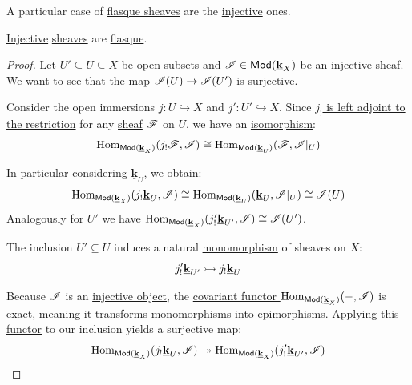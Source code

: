 \documentclass[../../main]{subfiles}
\begin{document}
A particular case of \hyperref[def:flasque-sheaf]{flasque sheaves} are the \hyperref[def:injective-projective-object]{injective} ones.
\begin{lemma}\label{lemma:injective-sheaves-are-flasque}
  \hyperref[def:injective-projective-object]{Injective} \hyperref[def:sheaf]{sheaves} are \hyperref[def:flasque-sheaf]{flasque}.
\end{lemma}
\begin{proof}
  Let \(U' \subseteq U \subseteq X\) be open subsets and \(\mathscr{I} \in \mathsf{Mod}(\underline{\mathbf{k}}_{X})\) be an \hyperref[def:injective-projective-object]{injective} \hyperref[def:sheaf]{sheaf}.
  We want to see that the map \(\mathscr{I}(U) \to \mathscr{I}(U')\) is surjective.

  Consider the open immersions \(j\colon U \hookrightarrow X\) and \(j'\colon U' \hookrightarrow X\).
  Since \hyperref[thm:open-immersion-adjunction-sheaf]{\(j_{!}\) is left adjoint to the restriction} for any \hyperref[def:sheaf]{sheaf} \(\mathscr{F}\) on \(U\), we have an \hyperref[def:categorical-isomorphism]{isomorphism}:
  \begin{equation*}
    \operatorname{Hom}_{\mathsf{Mod}(\underline{\mathbf{k}}_{X})}(j_{!} \mathscr{F}, \mathscr{I}) \cong \operatorname{Hom}_{\mathsf{Mod}(\underline{\mathbf{k}}_{U})}(\mathscr{F}, \mathscr{I}|_{U})
  \end{equation*}
  
  In particular considering \(\underline{\mathbf{k}}_{U}\), we obtain:
  \begin{equation*}
    \operatorname{Hom}_{\mathsf{Mod}(\underline{\mathbf{k}}_{X})}(j_{!} \underline{\mathbf{k}}_{U}, \mathscr{I}) \cong \operatorname{Hom}_{\mathsf{Mod}(\underline{\mathbf{k}}_{U})}(\underline{\mathbf{k}}_{U}, \mathscr{I}|_{U}) \cong \mathscr{I}(U)
  \end{equation*}
  Analogously for \(U'\) we have \(\operatorname{Hom}_{\mathsf{Mod}(\underline{\mathbf{k}}_{X})}(j'_{!} \underline{\mathbf{k}}_{U'}, \mathscr{I}) \cong \mathscr{I}(U')\).

  The inclusion \(U' \subseteq U\) induces a natural \hyperref[def:mono-epi-morphism]{monomorphism} of sheaves on \(X\):
  \begin{equation*}
    j'_{!} \underline{\mathbf{k}}_{U'} \rightarrowtail j_{!} \underline{\mathbf{k}}_{U}
  \end{equation*}
  
  Because \(\mathscr{I}\) is an \hyperref[def:injective-projective-object]{injective object}, the \hyperref[ex:hom-functor]{covariant functor \(\operatorname{Hom}_{\mathsf{Mod}(\underline{\mathbf{k}}_{X})}(-, \mathscr{I})\)} is \hyperref[def:exact-functor]{exact}, meaning it transforms \hyperref[def:mono-epi-morphism]{monomorphisms} into \hyperref[def:mono-epi-morphism]{epimorphisms}. Applying this \hyperref[def:functor]{functor} to our inclusion yields a surjective map:
  \begin{equation*}
    \operatorname{Hom}_{\mathsf{Mod}(\underline{\mathbf{k}}_{X})}(j_{!} \underline{\mathbf{k}}_{U}, \mathscr{I}) \twoheadrightarrow \operatorname{Hom}_{\mathsf{Mod}(\underline{\mathbf{k}}_{X})}(j'_{!} \underline{\mathbf{k}}_{U'}, \mathscr{I})
  \end{equation*}
  

\end{proof}
\end{document}
